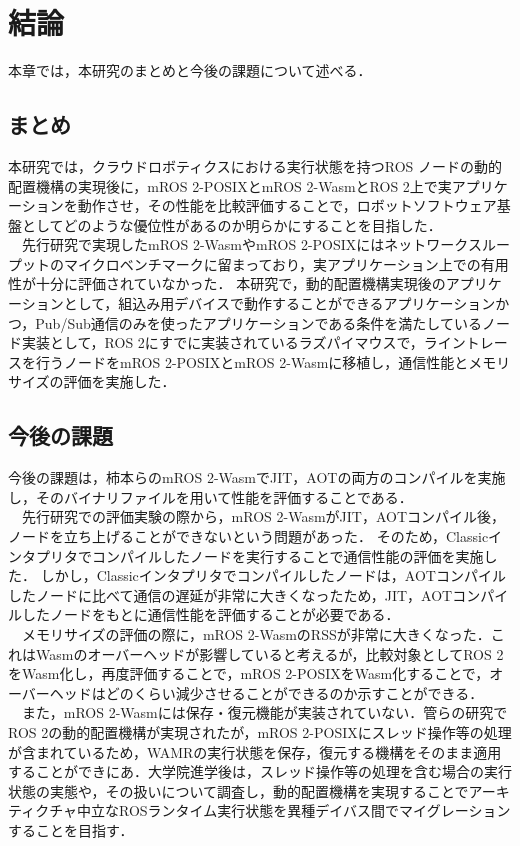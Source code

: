 \chapter{結論}
本章では，本研究のまとめと今後の課題について述べる．
\section{まとめ}
本研究では，クラウドロボティクスにおける実行状態を持つROS ノードの動的配置機構の実現後に，mROS 2-POSIXとmROS 2-WasmとROS 2上で実アプリケーションを動作させ，その性能を比較評価することで，ロボットソフトウェア基盤としてどのような優位性があるのか明らかにすることを目指した．
\\　先行研究で実現したmROS 2-WasmやmROS 2-POSIXにはネットワークスループットのマイクロベンチマークに留まっており，実アプリケーション上での有用性が十分に評価されていなかった．
本研究で，動的配置機構実現後のアプリケーションとして，組込み用デバイスで動作することができるアプリケーションかつ，Pub/Sub通信のみを使ったアプリケーションである条件を満たしているノード実装として，ROS 2にすでに実装されているラズパイマウスで，ライントレースを行うノードをmROS 2-POSIXとmROS 2-Wasmに移植し，通信性能とメモリサイズの評価を実施した．
\section{今後の課題}
今後の課題は，柿本らのmROS 2-WasmでJIT，AOTの両方のコンパイルを実施し，そのバイナリファイルを用いて性能を評価することである．
\\　先行研究での評価実験の際から，mROS 2-WasmがJIT，AOTコンパイル後，ノードを立ち上げることができないという問題があった．
そのため，Classicインタプリタでコンパイルしたノードを実行することで通信性能の評価を実施した．
しかし，Classicインタプリタでコンパイルしたノードは，AOTコンパイルしたノードに比べて通信の遅延が非常に大きくなったため，JIT，AOTコンパイルしたノードをもとに通信性能を評価することが必要である．
\\　メモリサイズの評価の際に，mROS 2-WasmのRSSが非常に大きくなった．これはWasmのオーバーヘッドが影響していると考えるが，比較対象としてROS 2をWasm化し，再度評価することで，mROS 2-POSIXをWasm化することで，オーバーヘッドはどのくらい減少させることができるのか示すことができる．
\\　また，mROS 2-Wasmには保存・復元機能が実装されていない．管らの研究でROS 2の動的配置機構が実現されたが，mROS 2-POSIXにスレッド操作等の処理が含まれているため，WAMRの実行状態を保存，復元する機構をそのまま適用することができにあ．大学院進学後は，スレッド操作等の処理を含む場合の実行状態の実態や，その扱いについて調査し，動的配置機構を実現することでアーキティクチャ中立なROSランタイム実行状態を異種デイバス間でマイグレーションすることを目指す．
